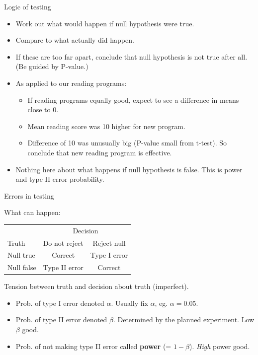\documentclass[ignorenonframetext,]{beamer}
\providecommand{\tightlist}{%
  \setlength{\itemsep}{0pt}\setlength{\parskip}{0pt}}
\begin{document}
\begin{frame}{Logic of testing}
\protect\hypertarget{logic-of-testing}{}

\begin{itemize}
\tightlist
\item
  Work out what would happen if null hypothesis were true.
\item
  Compare to what actually did happen.
\item
  If these are too far apart, conclude that null hypothesis is not true
  after all. (Be guided by P-value.)
\item
  As applied to our reading programs:

  \begin{itemize}
  \tightlist
  \item
    If reading programs equally good, expect to see a difference in
    means close to 0.
  \item
    Mean reading score was 10 higher for new program.
  \item
    Difference of 10 was unusually big (P-value small from t-test). So
    conclude that new reading program is effective.
  \end{itemize}
\item
  Nothing here about what happens if null hypothesis is false. This is
  power and type II error probability.
\end{itemize}

\end{frame}

\begin{frame}{Errors in testing}
\protect\hypertarget{errors-in-testing}{}

What can happen:

\begin{center}
\begin{tabular}{|l|cc|}
\hline
  & \multicolumn{2}{c|}{Decision}\\
Truth & Do not reject & Reject null\\
\hline
Null true & Correct & Type I error\\
Null false & Type II error & Correct\\
\hline
\end{tabular}  
\end{center}

Tension between truth and decision about truth (imperfect).

\begin{itemize}
\tightlist
\item
  Prob. of type I error denoted \(\alpha\). Usually fix \(\alpha\), eg.
  \(\alpha = 0.05\).
\item
  Prob. of type II error denoted \(\beta\). Determined by the planned
  experiment. Low \(\beta\) good.
\item
  Prob. of not making type II error called \textbf{power} (=
  \(1 - \beta\)). \emph{High} power good.
\end{itemize}

\end{frame}
\end{document}
